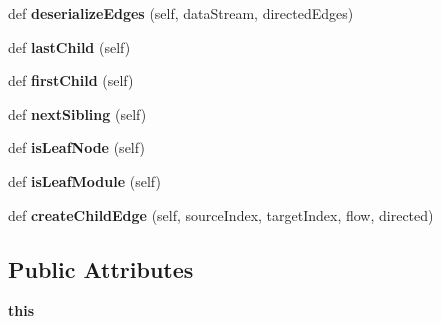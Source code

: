 \begin{DoxyCompactItemize}
def {\bfseries deserialize\+Edges} (self, data\+Stream, directed\+Edges)
\item 
\mbox{\label{classdsmacc_1_1graph_1_1infomap_1_1ChildIterator_aec6bd594176be831ffd62a3affc5f5f0}} 
def {\bfseries last\+Child} (self)
\item 
\mbox{\label{classdsmacc_1_1graph_1_1infomap_1_1ChildIterator_ae677f726907d496e728f19f94725d081}} 
def {\bfseries first\+Child} (self)
\item 
\mbox{\label{classdsmacc_1_1graph_1_1infomap_1_1ChildIterator_ae51c2c05cbdb95bbbc20956d3a40aec9}} 
def {\bfseries next\+Sibling} (self)
\item 
\mbox{\label{classdsmacc_1_1graph_1_1infomap_1_1ChildIterator_aa2d2486db7f14d0919a92d00f0307004}} 
def {\bfseries is\+Leaf\+Node} (self)
\item 
\mbox{\label{classdsmacc_1_1graph_1_1infomap_1_1ChildIterator_ad1ae5a8408e898aac3800abe1bae3a50}} 
def {\bfseries is\+Leaf\+Module} (self)
\item 
\mbox{\label{classdsmacc_1_1graph_1_1infomap_1_1ChildIterator_ac0cb03494db418a9053236eff68d0e3d}} 
def {\bfseries create\+Child\+Edge} (self, source\+Index, target\+Index, flow, directed)
\end{DoxyCompactItemize}
\subsection*{Public Attributes}
\begin{DoxyCompactItemize}
\item 
\mbox{\label{classdsmacc_1_1graph_1_1infomap_1_1ChildIterator_a1fbe8b7e7bae8faf7e3a9a1d6f8764d1}} 
{\bfseries this}
\end{DoxyCompactItemize}
